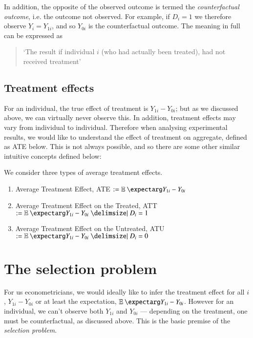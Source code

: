             In addition, the opposite of the observed outcome is termed the \textit{counterfactual outcome}, i.e. the outcome not observed. For example, if $D_i = 1$ we therefore observe $Y_i = Y_{1i}$, and so $Y_{0i}$ is the counterfactual outcome. The meaning in full can be expressed as
            \begin{quote}
                `The result if individual $i$ (who had actually been treated), had not received treatment'
            \end{quote}

        \subsection{Treatment effects}
            For an individual, the true effect of treatment is $Y_{1i} - Y_{0i}$; but as we discussed above, we can virtually never observe this. In addition, treatment effects may vary from individual to individual. Therefore when analysing experimental results, we would like to understand the effect of treatment on aggregate, defined as ATE below. This is not always possible, and so there are some other similar intuitive concepts defined below:
            \begin{definition}
                We consider three types of average treatment effects.
                \begin{enumerate}
                    \item Average Treatment Effect, ATE $:= \expect{Y_{1i} - Y_{0i}}$
                    \item Average Treatment Effect on the Treated, ATT $:= \expect{Y_{1i} - Y_{0i}| D_i = 1}$
                    \item Average Treatment Effect on the Untreated, ATU $:= \expect{Y_{1i} - Y_{0i}| D_i = 0}$
                \end{enumerate}
            \end{definition}


    \section{The selection problem}
        For us econometricians, we would ideally like to infer the treatment effect for all $i$, $Y_{1i}-Y_{0i}$ or at least the expectation, $\expect{Y_{1i}-Y_{0i}}$. However for an individual, we can’t observe both $Y_{1i}$ and $Y_{0i}$ — depending on the treatment, one must be counterfactual, as discussed above. This is the basic premise of the \textit{selection problem}.

